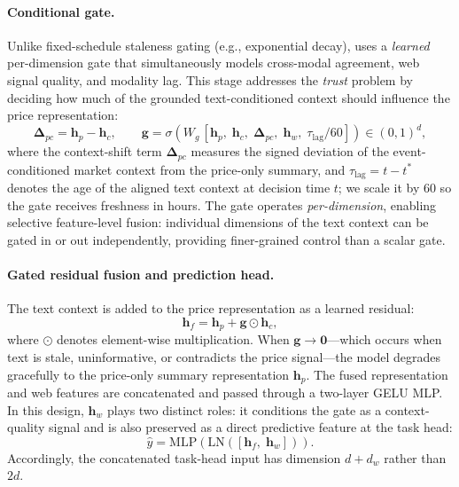 \paragraph{Conditional gate.}
Unlike fixed-schedule staleness gating (e.g., exponential decay), \CGCMA{} uses a \emph{learned} per-dimension gate that simultaneously models cross-modal agreement, web signal quality, and modality lag.
This stage addresses the \emph{trust} problem by deciding how much of the grounded text-conditioned context should influence the price representation:
\begin{equation}
\mathbf{\Delta}_{pc} = \mathbf{h}_{p} - \mathbf{h}_c,\qquad
\mathbf{g} = \sigma\!\left(W_g\,[\mathbf{h}_{p},\; \mathbf{h}_c,\; \mathbf{\Delta}_{pc},\; \mathbf{h}_{w},\; \tau_{\mathrm{lag}} / 60]\right) \in (0,1)^d,
\label{eq:cgcma_gate}
\end{equation}
where the context-shift term $\mathbf{\Delta}_{pc}$ measures the signed deviation of the event-conditioned market context from the price-only summary, and $\tau_{\mathrm{lag}} = t - t^\ast$ denotes the age of the aligned text context at decision time $t$; we scale it by $60$ so the gate receives freshness in hours.
The gate operates \emph{per-dimension}, enabling selective feature-level fusion: individual dimensions of the text context can be gated in or out independently, providing finer-grained control than a scalar gate.

\paragraph{Gated residual fusion and prediction head.}
The text context is added to the price representation as a learned residual:
\begin{equation}
\mathbf{h}_{f} = \mathbf{h}_{p} + \mathbf{g} \odot \mathbf{h}_c,
\label{eq:cgcma_fusion}
\end{equation}
where $\odot$ denotes element-wise multiplication.
When $\mathbf{g} \to \mathbf{0}$---which occurs when text is stale, uninformative, or contradicts the price signal---the model degrades gracefully to the price-only summary representation $\mathbf{h}_p$.
The fused representation and web features are concatenated and passed through a two-layer GELU MLP. In this design, $\mathbf{h}_w$ plays two distinct roles: it conditions the gate as a context-quality signal and is also preserved as a direct predictive feature at the task head:
\[
\hat{y} = \mathrm{MLP}(\mathrm{LN}([\mathbf{h}_{f},\; \mathbf{h}_{w}])).
\]
Accordingly, the concatenated task-head input has dimension $d + d_w$ rather than $2d$.

